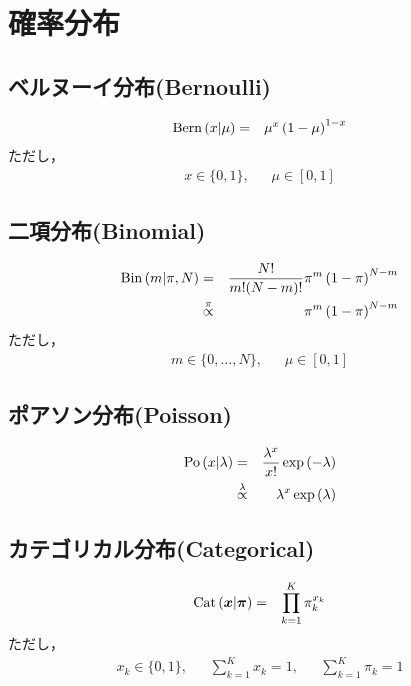 \documentclass[a4j]{jarticle}
\begin{document}
\section{確率分布}

\subsection{ベルヌーイ分布(Bernoulli)}
\begin{eqnarray}
\operatorname{\rm Bern}{( x | \mu )} &=& \mu^x \left( 1 - \mu \right)^{1 - x} \label{Bernoulli}
\end{eqnarray}
ただし，
\begin{eqnarray*}
x \in \{ 0,1 \} ,~~~~~~~\mu \in [0,1]
\end{eqnarray*}

\subsection{二項分布(Binomial)}
\begin{eqnarray}
\operatorname{\rm Bin}{( m | \pi , N)} &=& \frac{N!}{m!(N-m)!} \pi^m \left(1 - \pi \right)^{N-m}\label{Binomial} \\
&\overset{\pi}{\propto}& \pi^m \left(1 - \pi \right)^{N-m}
\end{eqnarray}
ただし，
\begin{eqnarray*}
m \in \{ 0,\dots,N \} ,~~~~~~~\mu \in [0,1]
\end{eqnarray*}

\subsection{ポアソン分布(Poisson)}
\begin{eqnarray}
\operatorname{\rm Po}{(x | \lambda)} &=& \frac{\lambda^x}{x!} \exp{(-\lambda)}
\label{Poisson}\\
&\overset{\lambda}{\propto}& \lambda^x\exp{(\lambda)}
\end{eqnarray}

\subsection{カテゴリカル分布(Categorical)}
\begin{eqnarray}
\operatorname{\rm Cat}{( \boldsymbol{x} | \boldsymbol{\pi} )} &=& \prod_{k=1}^{K}\pi_k^{x_k}\label{Categorical}
\end{eqnarray}
ただし，
\begin{eqnarray*}
x_k \in \{ 0,1 \} ,~~~~~~~\sum_{k=1}^{K}{x_k}=1,~~~~~~~\sum_{k=1}^{K}{\pi_k}=1
\end{eqnarray*}
\end{document}
